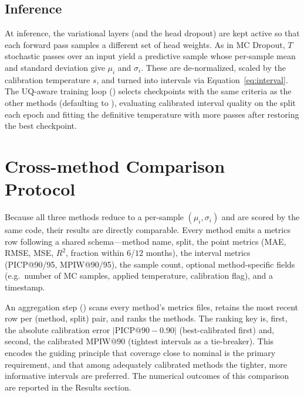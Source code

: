 \subsection{Inference}

At inference, the variational layers (and the head dropout) are kept active so
that each forward pass samples a different set of head weights. As in MC
Dropout, $T$ stochastic passes over an input yield a predictive sample whose
per-sample mean and standard deviation give $\mu_i$ and $\sigma_i$. These are
de-normalized, scaled by the calibration temperature $s$, and turned into
intervals via Equation~\eqref{eq:interval}. The UQ-aware training loop
() selects checkpoints with the same criteria as the other
methods (defaulting to ), evaluating calibrated interval quality on
the  split each epoch and fitting the definitive temperature with
more passes after restoring the best checkpoint.

\section{Cross-method Comparison Protocol}
\label{sec:compare}

Because all three methods reduce to a per-sample $(\mu_i, \sigma_i)$ and are
scored by the same code, their results are directly comparable. Every method
emits a metrics row following a shared schema---method name, split, the point
metrics (MAE, RMSE, MSE, $R^2$, fraction within $6$/$12$ months), the interval
metrics (PICP@90/95, MPIW@90/95), the sample count, optional method-specific
fields (e.g.\ number of MC samples, applied temperature, calibration flag), and
a timestamp.

An aggregation step () scans every method's metrics files,
retains the most recent row per (method, split) pair, and ranks the methods.
The ranking key is, first, the absolute calibration error
$\lvert \mathrm{PICP}@90 - 0.90 \rvert$ (best-calibrated first) and, second, the
calibrated $\mathrm{MPIW}@90$ (tightest intervals as a tie-breaker). This
encodes the guiding principle that coverage close to nominal is the primary
requirement, and that among adequately calibrated methods the tighter,
more informative intervals are preferred. The numerical outcomes of this
comparison are reported in the Results section.


